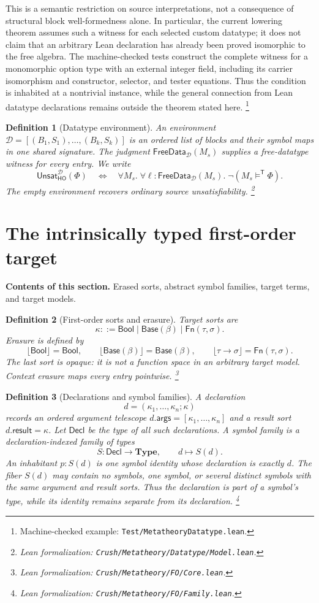 \documentclass[11pt]{article}
\newtheorem{definition}{Definition}[section]
\theoremstyle{remark}
\newcommand{\leanfile}[1]{\footnote{Lean formalization: \texttt{Crush/Metatheory/#1}.}}
\newcommand{\sectioncontents}[1]{%
  \smallskip\noindent\textbf{Contents of this section.} #1\par\medskip}
\newcommand{\Bool}{\mathsf{Bool}}
\newcommand{\Base}{\mathsf{Base}}
\newcommand{\Fn}{\mathsf{Fn}}
\newcommand{\erase}[1]{\lfloor #1\rfloor}
\newcommand{\satt}{\models^{\mathsf T}}
\newcommand{\unsat}{\mathsf{Unsat}}
\newcommand{\FreeDataModel}{\mathsf{FreeData}}
\begin{document}
This is a semantic restriction on source interpretations, not a consequence of
structural block well-formedness alone. In particular, the current lowering
theorem assumes such a witness for each selected custom datatype; it does not
claim that an arbitrary Lean declaration has already been proved isomorphic to
the free algebra. The machine-checked tests construct the complete witness for
a monomorphic option type with an external integer field, including its carrier
isomorphism and constructor, selector, and tester equations. Thus the condition
is inhabited at a nontrivial instance, while the general connection from Lean
datatype declarations remains outside the theorem stated here.
\footnote{Machine-checked example:
\texttt{Test/MetatheoryDatatype.lean}.}

\begin{definition}[Datatype environment]
An environment $\mathcal D=[(B_1,S_1),\ldots,(B_k,S_k)]$ is an ordered list
of blocks and their symbol maps in one shared signature. The judgment
$\FreeDataModel_{\mathcal D}(M_s)$ supplies a free-datatype witness for every entry. We write
\[
 \unsat_{\mathsf{HO}}^{\mathcal D}(\Phi)
 \quad\Longleftrightarrow\quad
 \forall M_s.\;\forall\ell:\FreeDataModel_{\mathcal D}(M_s).\;
   \neg(M_s\satt\Phi).
\]
The empty environment recovers ordinary source unsatisfiability.
\leanfile{Datatype/Model.lean}
\end{definition}

\section{The intrinsically typed first-order target}
\sectioncontents{Erased sorts, abstract symbol families, target terms, and target models.}

\begin{definition}[First-order sorts and erasure]
Target sorts are
\[
 \kappa ::= \Bool\mid\Base(\beta)\mid\Fn(\tau,\sigma).
\]
Erasure is defined by
\[
 \erase{\Bool}=\Bool,\qquad
 \erase{\Base(\beta)}=\Base(\beta),\qquad
 \erase{\tau\to\sigma}=\Fn(\tau,\sigma).
\]
The last sort is opaque: it is not a function space in an arbitrary target
model. Context erasure maps every entry pointwise.
\leanfile{FO/Core.lean}
\end{definition}

\begin{definition}[Declarations and symbol families]
A declaration
\[
 d=(\kappa_1,\ldots,\kappa_n;\kappa)
\]
records an ordered argument telescope
$d.\mathsf{args}=[\kappa_1,\ldots,\kappa_n]$ and a result sort
$d.\mathsf{result}=\kappa$. Let $\mathsf{Decl}$ be the type of all such
declarations. A \emph{symbol family} is a declaration-indexed family of types
\[
 S:\mathsf{Decl}\longrightarrow\mathbf{Type},
 \qquad d\longmapsto S(d).
\]
An inhabitant $p:S(d)$ is one symbol identity whose declaration is exactly
$d$. The fiber $S(d)$ may contain no symbols, one symbol, or several distinct
symbols with the same argument and result sorts. Thus the declaration is part
of a symbol's type, while its identity remains separate from its declaration.
\leanfile{FO/Family.lean}
\end{definition}
\end{document}
